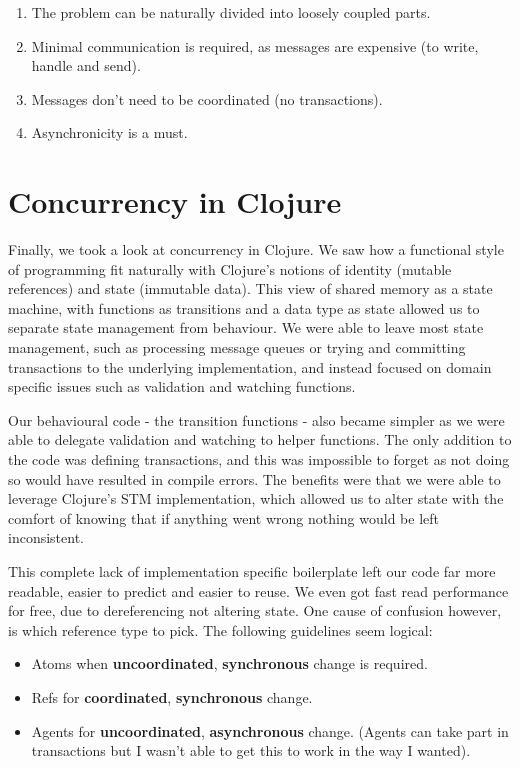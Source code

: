 \documentclass[a4paper,12pt]{kth-mag}
\begin{document}
\begin{enumerate}
\item The problem can be naturally divided into loosely coupled parts.
\item Minimal communication is required, as messages are expensive (to write, handle and send).
\item Messages don't need to be coordinated (no transactions).
\item Asynchronicity is a must.
\end{enumerate}

\section{Concurrency in Clojure}

Finally, we took a look at concurrency in Clojure. We saw how a functional style of programming fit naturally with Clojure's notions of identity (mutable references) and state (immutable data). This view of shared memory as a state machine, with functions as transitions and a data type as state allowed us to separate state management from behaviour. We were able to leave most state management, such as processing message queues or trying and committing transactions to the underlying implementation, and instead focused on domain specific issues such as validation and watching functions.

Our behavioural code - the transition functions - also became simpler as we were able to delegate validation and watching to helper functions. The only addition to the code was defining transactions, and this was impossible to forget as not doing so would have resulted in compile errors. The benefits were that we were able to leverage Clojure's STM implementation, which allowed us to alter state with the comfort of knowing that if anything went wrong nothing would be left inconsistent. 

This complete lack of implementation specific boilerplate left our code far more readable, easier to predict and easier to reuse. We even got fast read performance for free, due to dereferencing not altering state. One cause of confusion however, is which reference type to pick. The following guidelines seem logical:

\begin{itemize}
\item Atoms when \textbf{uncoordinated}, \textbf{synchronous} change is required.
\item Refs for \textbf{coordinated}, \textbf{synchronous} change.
\item Agents for \textbf{uncoordinated}, \textbf{asynchronous} change. (Agents can take part in transactions but I wasn't able to get this to work in the way I wanted).
\end{itemize}
\end{document}
